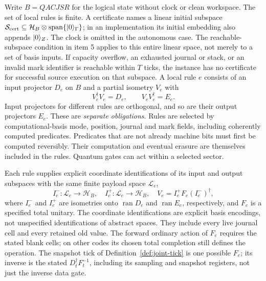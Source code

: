 \begin{definition}\label{def:tB-cert}
Write $B=QACJSR$ for the logical state without clock or clean workspace.
The set of local rules is finite. A certificate names a linear initial
subspace $\mathcal S_{\rm cert}\subseteq
\mathcal H_B\otimes\operatorname{span}\{\lvert 0\rangle_\Gamma\}$;
in an implementation its initial
embedding also appends $\lvert 0\rangle_Z$. The clock is omitted in the autonomous
case. The reachable-subspace condition in item 5 applies to this entire
linear space, not merely to a set of basis inputs. If capacity overflow,
an exhausted journal or stack, or an invalid mark identifier is reachable
within $T$ ticks, the instance has no certificate for successful source
execution on that subspace.
A local rule $e$ consists of an input projector $D_e$ on $B$ and a
partial isometry $V_e$ with
\[
 V_e^\dagger V_e=D_e,\qquad V_eV_e^\dagger=E_e.
\]
Input projectors for different rules are orthogonal, and so are their
output projectors $E_e$. These are \emph{separate obligations}.
Rules are selected by computational-basis mode, position, journal and
mark fields, including coherently computed predicates. Predicates that
are not already machine bits must first be computed reversibly.
Their computation and eventual erasure are themselves included in the
rules. Quantum gates can act within a selected sector.

Each rule supplies explicit coordinate identifications of its input and
output subspaces with the same finite payload space $\mathcal L_e$,
\[
 I_e^-:\mathcal L_e\longrightarrow\mathcal H_B,
 \quad I_e^+:\mathcal L_e\longrightarrow\mathcal H_B,
 \quad V_e=I_e^+F_e(I_e^-)^\dagger,                 \tag{B1}
\]
where $I_e^-$ and $I_e^+$ are isometries onto
$\operatorname{ran}D_e$ and $\operatorname{ran}E_e$, respectively, and $F_e$ is
a specified total unitary. The coordinate identifications are explicit
basis encodings, not unspecified identifications of abstract spaces.
They include every live journal cell and every retained old value.
The forward ordinary action of $F_e$ requires the stated blank cells;
on other codes its chosen total completion still defines the operation.
The snapshot tick of Definition~\ref{def:joint-tick} is one possible
$F_e$; its inverse is the stated $D_t^\dagger F_t^{-1}$, including its
sampling and snapshot registers, not just the inverse data gate.


\end{definition}
